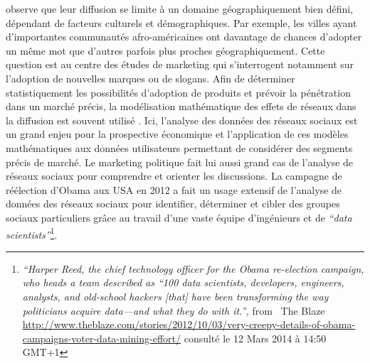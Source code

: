 \citep{Eisenstein2012} observe que leur diffusion se limite à un domaine géographiquement bien défini, dépendant de facteurs culturels et démographiques. Par exemple, les villes ayant d{\textquoteright}importantes communautés afro-américaines ont davantage de chances d{\textquoteright}adopter un m\^eme mot que d{\textquoteright}autres parfois plus proches géographiquement. Cette question est au centre des études de marketing qui s{\textquoteright}interrogent notamment sur l{\textquoteright}adoption de nouvelles marques ou de slogans. Afin de déterminer statistiquement les possibilités d{\textquoteright}adoption de produits et prévoir la pénétration dans un marché précis, la modélisation mathématique des effets de réseaux dans la diffusion est souvent utilisé \citep{Bass1994}. Ici, l{\textquoteright}analyse des données des réseaux sociaux est un grand enjeu pour la prospective économique et l{\textquoteright}application de ces modèles mathématiques aux données utilisateurs permettant de considérer des segments précis de marché. Le marketing politique fait lui aussi grand cas de l{\textquoteright}analyse de réseaux sociaux pour comprendre et orienter les discussions. La campagne de réélection d{\textquoteright}Obama aux USA en 2012 a fait un usage extensif de l{\textquoteright}analyse de données des réseaux sociaux pour identifier, déterminer et cibler des groupes sociaux particuliers gr\^ace au travail d{\textquoteright}une vaste équipe d{\textquoteright}ingénieurs et de \textit{{\textquotedblleft}data scientists{\textquotedblright}}\footnote{ \textit{{\textquotedblleft}Harper Reed, the chief technology officer for the Obama re-election campaign, who heads a team described as {\textquotedblleft}100 data scientists, developers, engineers, analysts, and old-school hackers [that] have been transforming the way politicians acquire data---and what they do with it.{\textquotedblright}, }from \ The Blaze \url{http://www.theblaze.com/stories/2012/10/03/very-creepy-details-of-obama-campaigns-voter-data-mining-effort/} consulté le 12 Mars 2014 à 14:50 GMT+1}. 

